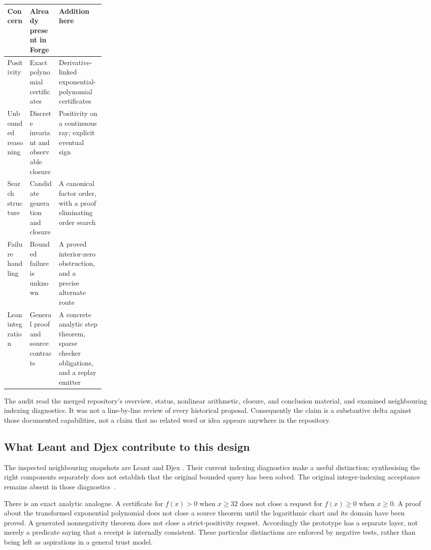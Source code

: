 \begin{center}
\begin{tabularx}{\linewidth}{@{}p{0.23\linewidth}XX@{}}
\toprule
Concern & Already present in Forge & Addition here\\
\midrule
Positivity & Exact polynomial certificates & Derivative-linked exponential-polynomial certificates\\
Unbounded reasoning & Discrete invariant and observable closure & Positivity on a continuous ray; explicit eventual sign\\
Search structure & Candidate generation and closure & A canonical factor order, with a proof eliminating order search\\
Failure handling & Bounded failure is unknown & A proved interior-zero obstruction, and a precise alternate route\\
Lean integration & General proof and source contracts & A concrete analytic step theorem, sparse checker obligations, and a replay emitter\\
\bottomrule
\end{tabularx}
\end{center}

The audit read the merged repository's overview, status, nonlinear arithmetic,
closure, and conclusion material, and examined neighbouring indexing diagnostics.
It was not a line-by-line review of every historical proposal. Consequently the
claim is a substantive delta against those documented capabilities, not a claim
that no related word or idea appears anywhere in the repository.

\subsection{What Leant and Djex contribute to this design}

The inspected neighbouring snapshots are Leant
and Djex
.
Their current indexing diagnostics make a useful distinction: synthesising the
right components separately does not establish that the original bounded query
has been solved. The original integer-indexing acceptance remains absent in
those diagnostics~\cite{leant,djex}.

There is an exact analytic analogue. A certificate for $f(x)>0$ when $x\ge32$
does not close a request for $f(x)\ge0$ when $x\ge0$. A proof about the transformed
exponential polynomial does not close a source theorem until the logarithmic
chart and its domain have been proved. A generated nonnegativity theorem does
not close a strict-positivity request. Accordingly the prototype has a separate
 layer, not merely a predicate saying that a receipt is
internally consistent. These particular distinctions are enforced by negative
tests, rather than being left as aspirations in a general trust model.

